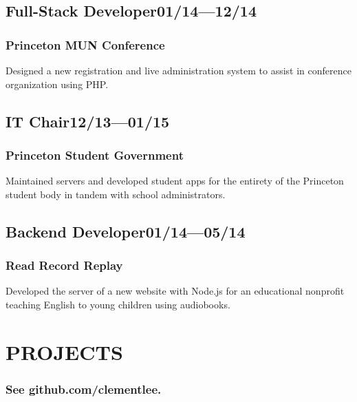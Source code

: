 \documentclass[11pt]{article}
\begin{document}
\begin{multicols}{2}
  \subsection*{Full-Stack Developer\hfill\textnormal{01/14---12/14}}
  \subsubsection*{Princeton MUN Conference}
  Designed a new registration and live administration system to assist in conference organization using PHP.

  \subsection*{IT Chair\hfill\textnormal{12/13---01/15}}
  \subsubsection*{Princeton Student Government}
  Maintained servers and developed student apps for the entirety of the Princeton student body in tandem with school administrators.

  \subsection*{Backend Developer\hfill\textnormal{01/14---05/14}}
  \subsubsection*{Read Record Replay}
  Developed the server of a new website with Node.js for an educational nonprofit teaching English to young children using audiobooks.

  \section*{PROJECTS}
  \vspace{-0.5\baselineskip}
  \subsubsection*{See github.com/clementlee.}

  \vspace{2\baselineskip}



\end{multicols}
\end{document}
